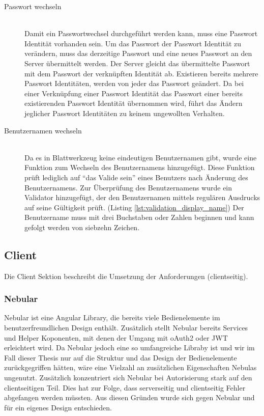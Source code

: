 \begin{description}
	\item[Passwort wechseln]\hfill\\
	Damit ein Passwortwechsel durchgeführt werden kann, muss eine Passwort Identität vorhanden sein. Um das Passwort der Passwort Identität zu verändern, muss das derzeitige Passwort und eine neues Passwort an den Server übermittelt werden. Der Server gleicht das übermittelte Passwort mit dem Passwort der verknüpften Identität ab. Existieren bereits mehrere Passwort Identitäten, werden von jeder das Passwort geändert. Da bei einer Verknüpfung einer Passwort Identität das Passwort einer bereits existierenden Passwort Identität übernommen wird, führt das Ändern jeglicher Passwort Identitäten zu keinem ungewollten Verhalten.
	\item[Benutzernamen wechseln]\hfill\\
	Da es in Blattwerkzeug keine eindeutigen Benutzernamen gibt, wurde eine Funktion zum Wechseln des Benutzernamens hinzugefügt. Diese Funktion prüft lediglich auf \enquote{das Valide sein} eines Benutzers nach Änderung des Benutzernamens. Zur Überprüfung des Benutzernamens wurde ein Validator hinzugefügt, der den Benutzernamen mittels regulären Ausdrucks auf seine Gültigkeit prüft. (Listing \ref{lst:validation_display_name}) Der Benutzername muss mit drei Buchstaben oder Zahlen beginnen und kann gefolgt werden von siebzehn Zeichen.

\end{description}



\subsection{Client}
\label{sec: client}
Die Client Sektion beschreibt die Umsetzung der Anforderungen (clientseitig).

\subsubsection{Nebular}
\label{sec: nebular}
Nebular ist eine Angular Library, die bereits viele Bedienelemente im benutzerfreundlichen Design enthält. Zusätzlich stellt Nebular bereits Services und Helper Koponenten, mit denen der Umgang mit \gls{oAuth2} oder \gls{JWT} erleichtert wird. Da Nebular jedoch eine so umfangreiche Libraby ist und wir im Fall dieser Thesis nur auf die Struktur und das Design der Bedienelemente zurückgegriffen hätten, wäre eine Vielzahl an zusätzlichen Eigenschaften Nebulas ungenutzt. Zusätzlich konzentriert sich Nebular bei Autorisierung stark auf den clientseitigen Teil. Dies hat zur Folge, dass serverseitig und clientseitig Fehler abgefangen werden müssten. Aus diesen Gründen wurde sich gegen Nebular und für ein eigenes Design entschieden.

